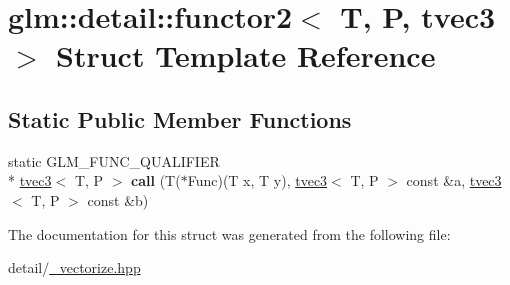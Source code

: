 \hypertarget{structglm_1_1detail_1_1functor2_3_01T_00_01P_00_01tvec3_01_4}{\section{glm\-:\-:detail\-:\-:functor2$<$ T, P, tvec3 $>$ Struct Template Reference}
\label{structglm_1_1detail_1_1functor2_3_01T_00_01P_00_01tvec3_01_4}
}
\subsection*{Static Public Member Functions}
\begin{DoxyCompactItemize}
\item 
\hypertarget{structglm_1_1detail_1_1functor2_3_01T_00_01P_00_01tvec3_01_4_a2dc546f8027af1bbceab38b5a2b5a146}{static G\-L\-M\-\_\-\-F\-U\-N\-C\-\_\-\-Q\-U\-A\-L\-I\-F\-I\-E\-R \\*
\hyperlink{structglm_1_1tvec3}{tvec3}$<$ T, P $>$ {\bfseries call} (T($\ast$Func)(T x, T y), \hyperlink{structglm_1_1tvec3}{tvec3}$<$ T, P $>$ const \&a, \hyperlink{structglm_1_1tvec3}{tvec3}$<$ T, P $>$ const \&b)}\label{structglm_1_1detail_1_1functor2_3_01T_00_01P_00_01tvec3_01_4_a2dc546f8027af1bbceab38b5a2b5a146}

\end{DoxyCompactItemize}


The documentation for this struct was generated from the following file\-:\begin{DoxyCompactItemize}
\item 
detail/\hyperlink{__vectorize_8hpp}{\-\_\-vectorize.\-hpp}\end{DoxyCompactItemize}
